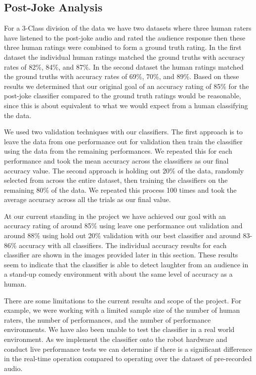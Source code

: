 \documentclass[onecolumn, draftclsnofoot,10pt, compsoc]{IEEEtran}
\begin{document}
\subsection{Post-Joke Analysis}
For a 3-Class division of the data we have two datasets where three human raters have listened to the post-joke audio and rated the audience response then these three human ratings were combined to form a ground truth rating. In the first dataset the individual human ratings matched the ground truths with accuracy rates of 82\%, 84\%, and 87\%. In the second dataset the human ratings matched the ground truths with accuracy rates of 69\%, 70\%, and 89\%. Based on these results we determined that our original goal of an accuracy rating of 85\% for the post-joke classifier compared to the ground truth ratings would be reasonable, since this is about equivalent to what we would expect from a human classifying the data.\par
\vspace{.3cm}
\noindent We used two validation techniques with our classifiers. The first approach is to leave the data from one performance out for validation then train the classifier using the data from the remaining performances. We repeated this for each performance and took the mean accuracy across the classifiers as our final accuracy value. The second approach is holding out 20\% of the data, randomly selected from across the entire dataset, then training the classifiers on the remaining 80\% of the data. We repeated this process 100 times and took the average accuracy across all the trials as our final value.\par
\vspace{.3cm}
\noindent At our current standing in the project we have achieved our goal with an accuracy rating of around 85\% using leave one performance out validation and around 88\% using hold out 20\% validation with our best classifier and around 83-86\% accuracy with all classifiers. The individual accuracy results for each classifier are shown in the images provided later in this section. These results seem to indicate that the classifier is able to detect laughter from an audience in a stand-up comedy environment with about the same level of accuracy as a human.\par
\vspace{.3cm}
\noindent There are some limitations to the current results and scope of the project. For example, we were working with a limited sample size of the number of human raters, the number of performances, and the number of performance environments. We have also been unable to test the classifier in a real world environment. As we implement the classifier onto the robot hardware and conduct live performance tests we can determine if there is a significant difference in the real-time operation compared to operating over the dataset of pre-recorded audio.
\end{document}

